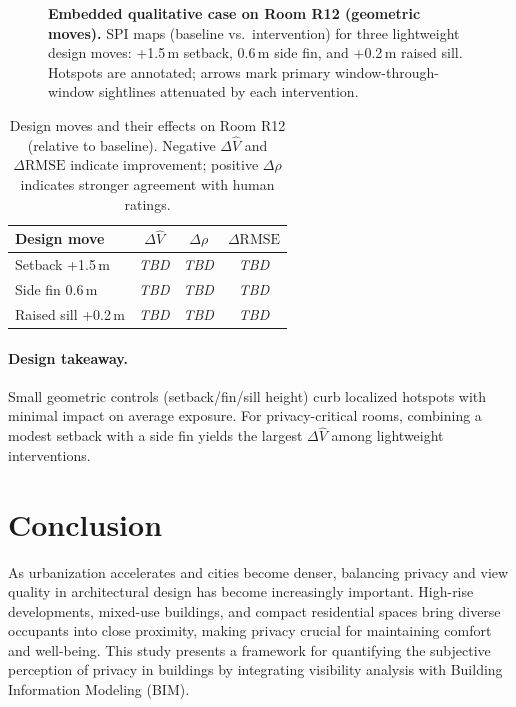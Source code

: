 \documentclass[final,3p,times,review]{elsarticle}
\begin{document}
\begin{figure}[t]
  \centering
  \caption{\textbf{Embedded qualitative case on Room R12 (geometric moves).} SPI maps (baseline vs.\ intervention) for three lightweight design moves: +1.5\,m setback, 0.6\,m side fin, and +0.2\,m raised sill. Hotspots are annotated; arrows mark primary window-through-window sightlines attenuated by each intervention.}
  \label{fig:sensitivity-case}
\end{figure}

\begin{table}[H]
\centering
\caption{Design moves and their effects on Room R12 (relative to baseline). Negative $\Delta\widehat{V}$ and $\Delta\text{RMSE}$ indicate improvement; positive $\Delta\rho$ indicates stronger agreement with human ratings.}
\label{tab:case_deltas}
\setlength{\tabcolsep}{6pt}
\renewcommand{\arraystretch}{1.15}
\begin{tabular}{@{}lccc@{}}
\toprule
Design move & $\Delta\widehat{V}$ & $\Delta\rho$ & $\Delta\text{RMSE}$ \\
\midrule
Setback +1.5\,m & \textit{TBD} & \textit{TBD} & \textit{TBD} \\
Side fin 0.6\,m & \textit{TBD} & \textit{TBD} & \textit{TBD} \\
Raised sill +0.2\,m & \textit{TBD} & \textit{TBD} & \textit{TBD} \\
\bottomrule
\end{tabular}
\end{table}

\paragraph{Design takeaway.}
Small geometric controls (setback/fin/sill height) curb localized hotspots with minimal impact on average exposure. For privacy-critical rooms, combining a modest setback with a side fin yields the largest $\Delta\widehat{V}$ among lightweight interventions.

\section*{Conclusion}

As urbanization accelerates and cities become denser, balancing privacy and view quality in architectural design has become increasingly important. High-rise developments, mixed-use buildings, and compact residential spaces bring diverse occupants into close proximity, making privacy crucial for maintaining comfort and well-being. This study presents a framework for quantifying the subjective perception of privacy in buildings by integrating visibility analysis with Building Information Modeling (BIM).
\end{document}
